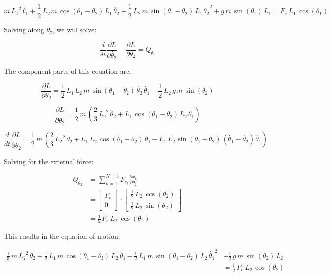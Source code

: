 \documentclass[12pt, letterpaper]{../assignment}
\begin{document}
$$ m\,{L_1 }^2 \,\ddot{\theta_1} +\frac{1}{2}\,L_2 \,m\,\cos \left(\theta_1 -\theta_2 \right)\,L_1 \,\ddot{\theta_2} +\frac{1}{2}\,L_2 \,m\,\sin \left(\theta_1 -\theta_2 \right)\,L_1 \,{{\dot{\theta_2}}}^2 +g\,m\,\sin \left(\theta_1 \right)\,L_1  = F_e \,L_1 \,\cos \left(\theta_1\right) $$

Solving along $\theta_2$, we will solve:

$$ \frac{d}{d t} \frac{\partial L}{\partial \dot{\theta_2}} - \frac{\partial L}{\partial \theta_2} =  Q_{\theta_2} $$

The component parts of this equation are:

$$ \frac{\partial L}{\partial \theta_2} = 
\frac{1}{2}\,L_1 \,L_2 \,m\,\sin \left(\theta_1 -\theta_2 \right)\,\dot{\theta_2} \,\dot{\theta_1} -\frac{1}{2}\,L_2 \,g\,m\,\sin \left(\theta_2 \right) $$

$$ \frac{\partial L}{\partial \dot{\theta_2}}  =
\frac{1}{2}\,m\,{\left(\frac{2}{3}\,{L_2 }^2 \,\dot{\theta_2} +L_1 \,\cos \left(\theta_1 -\theta_2 \right)\,L_2 \,\dot{\theta_1} \right)} $$

$$ \frac{d}{d t} \frac{\partial L}{\partial \dot{\theta_2}} =
\frac{1}{2}\,m\,{\left(\frac{2}{3}\,{L_2 }^2 \,\ddot{\theta_2} +L_1 \,L_2 \,\cos \left(\theta_1 -\theta_2 \right)\,\ddot{\theta_1} -L_1 \,L_2 \,\sin \left(\theta_1 -\theta_2 \right)\,{\left(\dot{\theta_1} -\dot{\theta_2} \right)}\,\dot{\theta_1} \right)} $$

Solving for the external force:

\begin{equation*}
    \begin{aligned}
    Q_{\theta_2} &= \sum_{k=1}^{N=3} F_{e_k} \frac{\partial x_k }{\partial {\theta_2}}\\
    &=\left[\begin{array}{c} F_{e}\\ 0 \end{array}\right] \cdot \left[\begin{array}{c} \frac{1}{2}\,L_{2}\,\cos\left(\theta _{2}\right)\\ \frac{1}{2}\,L_{2}\,\sin\left(\theta _{2}\right) \end{array}\right]\\
    &= \frac{1}{2}\,F_e \,L_2 \,\cos \left(\theta_2\right)
    \end{aligned}
\end{equation*}

This results in the equation of motion:

\begin{equation*}
    \begin{aligned}
    \frac{1}{3}\,m\,{L_2 }^2 \,\ddot{\theta_2} +\frac{1}{2}\,L_1 \,m\,\cos \left(\theta_1 -\theta_2 \right)\,L_2 \,\ddot{\theta_1} -\frac{1}{2}\,L_1 \,m\,\sin \left(\theta_1 -\theta_2 \right)\,L_2 \,{{\dot{\theta_1}}}^2 &+\frac{1}{2}\,g\,m\,\sin \left(\theta_2 \right)\,L_2 \\
    &= \frac{1}{2}\,F_e \,L_2 \,\cos \left(\theta_2\right)
    \end{aligned}
\end{equation*}
\end{document}
